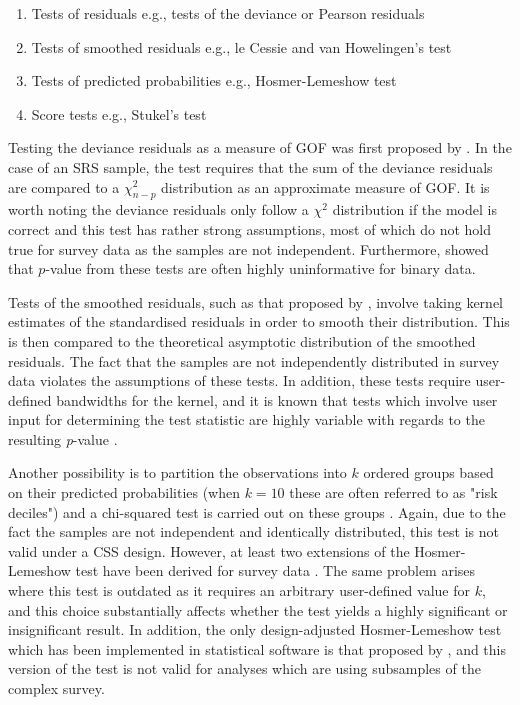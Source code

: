 \begin{enumerate}
\item Tests of residuals e.g., tests of the deviance or Pearson residuals
\item Tests of smoothed residuals e.g., le Cessie and van Howelingen's test
\item Tests of predicted probabilities e.g., Hosmer-Lemeshow test 
\item Score tests e.g., Stukel's test
\end{enumerate}

Testing the deviance residuals as a measure of GOF was first proposed by \citet{nelder1972}. In the case of an SRS sample, the test requires that the sum of the deviance residuals are compared to a $\chi^{2}_{n-p}$ distribution as an approximate measure of GOF. It is worth noting the deviance residuals only follow a $\chi^{2}$ distribution if the model is correct and this test has rather strong assumptions, most of which do not hold true for survey data as the samples are not independent. Furthermore, \citet{hosmer1997} showed that $p$-value from these tests are often highly uninformative for binary data.

Tests of the smoothed residuals, such as that proposed by \citet{lecessie1995}, involve taking kernel estimates of the standardised residuals in order to smooth their distribution. This is then compared to the theoretical asymptotic distribution of the smoothed residuals. The fact that the samples are not independently distributed in survey data violates the assumptions of these tests. In addition, these tests require user-defined bandwidths for the kernel, and it is known that tests which involve user input for determining the test statistic are highly variable with regards to the resulting \emph{p}-value \citep{hosmer1997}.

Another possibility is to partition the observations into $k$ ordered groups based on their predicted probabilities (when $k = 10$ these are often referred to as "risk deciles") and a chi-squared test is carried out on these groups \citep{hosmer1980}. Again, due to the fact the samples are not independent and identically distributed, this test is not valid under a CSS design. However, at least two extensions of the Hosmer-Lemeshow test have been derived for survey data \citep{archer2006, shah2003}. The same problem arises where this test is outdated as it requires an arbitrary user-defined value for $k$, and this choice substantially affects whether the test yields a highly significant or insignificant result. In addition, the only design-adjusted Hosmer-Lemeshow test which has been implemented in statistical software is that proposed by \citet{archer2006}, and this version of the test is not valid for analyses which are using subsamples of the complex survey.

